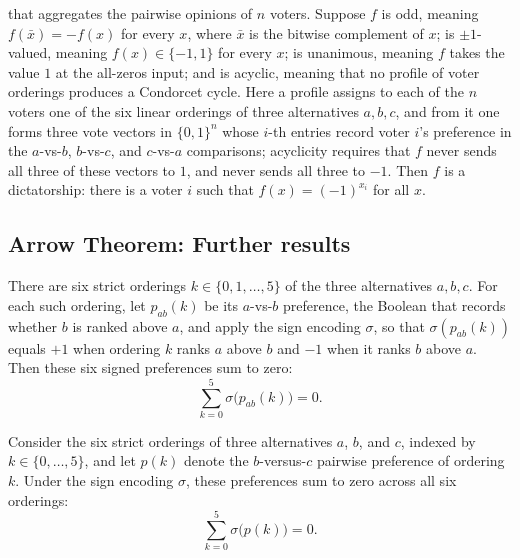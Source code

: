 \begin{theorem}
that aggregates the pairwise opinions of $n$ voters. Suppose $f$ is odd, meaning $f(\bar
x) = -f(x)$ for every $x$, where $\bar x$ is the bitwise complement of $x$; is $\pm
1$-valued, meaning $f(x)\in\{-1,1\}$ for every $x$; is unanimous, meaning $f$ takes the
value $1$ at the all-zeros input; and is acyclic, meaning that no profile of voter
orderings produces a Condorcet cycle. Here a profile assigns to each of the $n$ voters
one of the six linear orderings of three alternatives $a,b,c$, and from it one forms
three vote vectors in $\{0,1\}^n$ whose $i$-th entries record voter $i$'s preference in
the $a$-vs-$b$, $b$-vs-$c$, and $c$-vs-$a$ comparisons; acyclicity requires that $f$
never sends all three of these vectors to $1$, and never sends all three to $-1$. Then
$f$ is a dictatorship: there is a voter $i$ such that $f(x) = (-1)^{x_i}$ for all $x$.
\end{theorem}

\subsection*{Arrow Theorem: Further results}

\begin{lemma}
\label{ArrowTheorem.sum_abPref_sign}
\leanok
{}
There are six strict orderings $k \in \{0,1,\dots,5\}$ of the three alternatives
$a,b,c$. For each such ordering, let $p_{ab}(k)$ be its $a$-vs-$b$ preference, the
Boolean that records whether $b$ is ranked above $a$, and apply the sign encoding
$\sigma$, so that $\sigma(p_{ab}(k))$ equals $+1$ when ordering $k$ ranks $a$ above $b$
and $-1$ when it ranks $b$ above $a$. Then these six signed preferences sum to zero:
\[
  \sum_{k=0}^{5} \sigma\bigl(p_{ab}(k)\bigr) = 0.
\]
\end{lemma}

\begin{lemma}
\label{ArrowTheorem.sum_bcPref_sign}
\leanok
{}
Consider the six strict orderings of three alternatives $a$, $b$, and $c$, indexed by $k
\in \{0,\dots,5\}$, and let $p(k)$ denote the $b$-versus-$c$ pairwise preference of
ordering $k$. Under the sign encoding $\sigma$, these preferences sum to zero across all
six orderings:
\[
  \sum_{k=0}^{5} \sigma\bigl(p(k)\bigr) = 0.
\]
\end{lemma}

